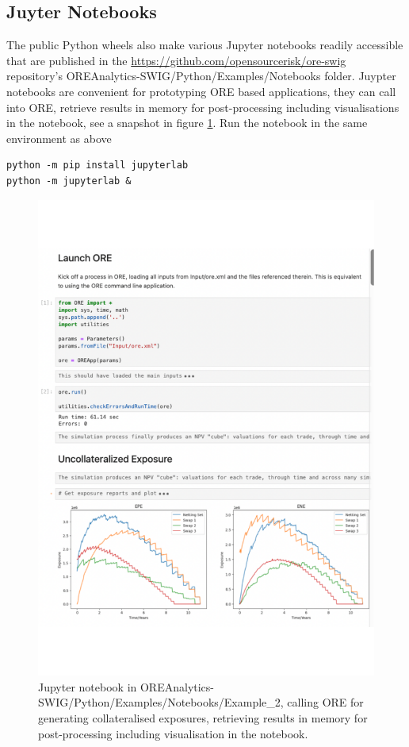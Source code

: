 \documentclass[12pt, a4paper]{report}
\begin{document}
\subsection*{Juyter Notebooks}

The public Python wheels also make various Jupyter notebooks readily accessible that are published
in the \url{https://github.com/opensourcerisk/ore-swig} repository's
OREAnalytics-SWIG/Python/Examples/Notebooks folder.
Juypter notebooks are convenient for prototyping ORE based applications, they can call into ORE,
retrieve results in memory for post-processing including visualisations in the notebook,
see a snapshot in figure \ref{fig:notebook}. Run the notebook in the same environment as above

\begin{verbatim}
python -m pip install jupyterlab
python -m jupyterlab &
\end{verbatim}

\begin{figure}[h]
\begin{center}
\includegraphics[scale=0.8]{data/notebook.pdf}
\end{center}
\caption{Jupyter notebook in OREAnalytics-SWIG/Python/Examples/Notebooks/Example\_2,
  calling ORE for generating collateralised exposures, retrieving results in memory for post-processing
  including visualisation in the notebook.}
\label{fig:notebook}
\end{figure}
\clearpage
\end{document}
